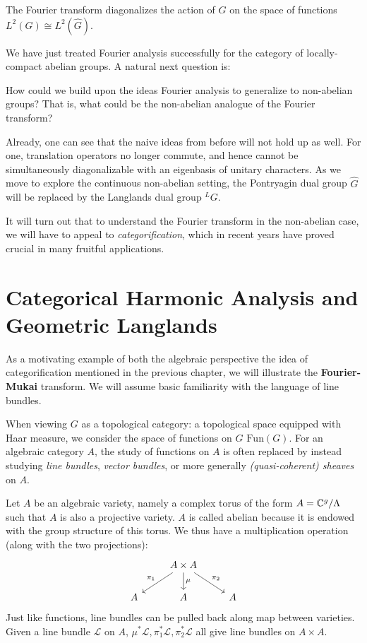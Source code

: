 \begin{fact}
	The Fourier transform diagonalizes the action of $G$ on the space of functions $L^2(G) \cong L^2(\hat G)$.
\end{fact}

We have just treated Fourier analysis successfully for the category of locally-compact abelian groups. A natural next question is:
\begin{ques}
	How could we build upon the ideas Fourier analysis to generalize to non-abelian groups? That is, what could be the non-abelian analogue of the Fourier transform?
\end{ques}
Already, one can see that the naive ideas from before will not hold up as well. For one, translation operators no longer commute, and hence cannot be simultaneously diagonalizable with an eigenbasis of unitary characters. As we move to explore the continuous non-abelian setting, the Pontryagin dual group $\hat G$ will be replaced by the Langlands dual group $^L G$.

It will turn out that to understand the Fourier transform in the non-abelian case, we will have to appeal to \emph{categorification}, which in recent years have proved crucial in many fruitful applications.


\section{Categorical Harmonic Analysis and Geometric Langlands} %
\label{sec:categorical_harmonic_analysis_and_geometric_langlands}

As a motivating example of both the algebraic perspective the idea of categorification mentioned in the previous chapter, we will illustrate the \textbf{Fourier-Mukai} transform. We will assume basic familiarity with the language of line bundles. 

When viewing $G$ as a topological category: a topological space equipped with Haar measure, we consider the space of functions on $G$ $\mathrm{Fun}(G)$. For an algebraic category $A$, the study of functions on $A$ is often replaced by instead studying \emph{line bundles}, \emph{vector bundles}, or more generally \emph{(quasi-coherent) sheaves} on $A$.

Let $A$ be an algebraic variety, namely a complex torus of the form $A = \mathbb{C}^g/\Lambda$ such that $A$ is also a projective variety. $A$ is called abelian because it is endowed with the group structure of this torus. We thus have a multiplication operation (along with the two projections):
\[
	\begin{tikzcd}
		& A \times A \arrow[ld,swap,"\pi_1"] \arrow[d,"\mu"] \arrow[rd,"\pi_2"]&\\
		A & A & A
	\end{tikzcd}
\]
Just like functions, line bundles can be pulled back along map between varieties. Given a line bundle $\mathcal L$ on $A$, $\mu^* \mathcal L, \pi^*_1 \mathcal L, \pi_2^* \mathcal L$ all give line bundles on $A \times A$.

